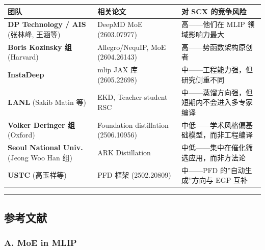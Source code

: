 \documentclass[
  12pt,
]{ctexart}
\begin{document}
\begin{longtable}[]{@{}
  >{\raggedright\arraybackslash}p{}
  >{\raggedright\arraybackslash}p{}
  >{\centering\arraybackslash}p{}@{}}
\toprule\noalign{}
\begin{minipage}[b]{\linewidth}\raggedright
团队
\end{minipage} & \begin{minipage}[b]{\linewidth}\raggedright
相关论文
\end{minipage} & \begin{minipage}[b]{\linewidth}\centering
对 SCX 的竞争风险
\end{minipage} \\
\midrule\noalign{}
\endhead
\bottomrule\noalign{}
\endlastfoot
\textbf{DP Technology / AIS} (张林峰, 王涵等) & DeepMD MoE (2603.07977)
& 高------他们在 MLIP 领域影响力最大 \\
\textbf{Boris Kozinsky 组} (Harvard) & Allegro/NequIP, MoE (2604.26143)
& 高------势函数架构原创者 \\
\textbf{InstaDeep} & mlip JAX 库 (2605.22698) &
中------工程能力强，但研究侧重不同 \\
\textbf{LANL} (Sakib Matin 等) & EKD, Teacher-student RSC &
中------蒸馏方向强，但短期内不会进入多专家编译 \\
\textbf{Volker Deringer 组} (Oxford) & Foundation distillation
(2506.10956) & 中低------学术风格偏基础模型，而非工程编译 \\
\textbf{Seoul National Univ.} (Jeong Woo Han 组) & ARK Distillation &
中低------集中在催化筛选应用，而非方法论 \\
\textbf{USTC} (高玉祥等) & PFD 框架 (2502.20809) & 中------PFD
的''自动生成''方向与 EGP 互补 \\
\end{longtable}

\begin{center}\rule{0.5\linewidth}{0.5pt}\end{center}

\subsection{参考文献}\label{ux53c2ux8003ux6587ux732e}

\subsubsection{A. MoE in MLIP}\label{a.-moe-in-mlip}
\end{document}
